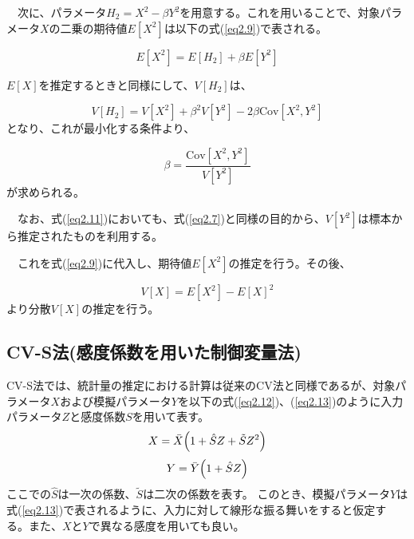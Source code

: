 \documentclass[a4paper,11pt,titlepage,uplatex]{jsreport}
\begin{document}
\begin{itemize}
  　次に、パラメータ$H_2 = X^2 - \beta Y^2$を用意する。これを用いることで、対象パラメータ$X$の二乗の期待値$E\left[X^2\right]$は以下の式(\ref{eq2.9})で表される。

  \begin{equation}
    E\left[X^2\right] = E\left[H_2\right] + \beta E\left[Y^2\right]
    \label{eq2.9}
  \end{equation}

  $E\left[X\right]$を推定するときと同様にして、$V\left[H_2\right]$は、

  \begin{equation}
    V\left[H_2\right] = V\left[X^2\right] + \beta^2 V\left[Y^2\right] - 2\beta \mathrm{Cov}\left[X^2,Y^2\right]
    \label{eq2.10}
  \end{equation}
  となり、これが最小化する条件より、

  \begin{equation}
    \beta = \frac{\mathrm{Cov}\left[X^2,Y^2\right]}{V\left[Y^2\right]}
    \label{eq2.11}
  \end{equation}
  が求められる。
  
  　なお、式(\ref{eq2.11})においても、式(\ref{eq2.7})と同様の目的から、$V\left[Y^2\right]$は標本から推定されたものを利用する。
  
  　これを式(\ref{eq2.9})に代入し、期待値$E\left[X^2\right]$の推定を行う。その後、

  \begin{equation}
    V\left[X\right] = E\left[X^2\right] - E\left[X\right]^2
    \label{eq2.12}
  \end{equation}
  より分散$V\left[X\right]$の推定を行う。

\end{itemize}

\subsection{CV-S法(感度係数を用いた制御変量法)}
CV-S法では、統計量の推定における計算は従来のCV法と同様であるが、対象パラメータ$X$および模擬パラメータ$Y$を以下の式(\ref{eq2.12})、(\ref{eq2.13})のように入力パラメータ$Z$と感度係数$S$を用いて表す。
\begin{equation}
  X = \bar{X} \Bigl( 1 + \hat{S} Z + \tilde{S} Z^2 \Bigr)
  \label{eq2.12}
\end{equation}
\begin{equation}
  Y = \bar{Y} \Bigl( 1 + \hat{S} Z \Bigr)
  \label{eq2.13}
\end{equation}
ここでの$\hat{S}$は一次の係数、$\tilde{S}$は二次の係数を表す。
このとき、模擬パラメータ$Y$は式(\ref{eq2.13})で表されるように、入力に対して線形な振る舞いをすると仮定する。また、$X$と$Y$で異なる感度を用いても良い。
\end{document}
